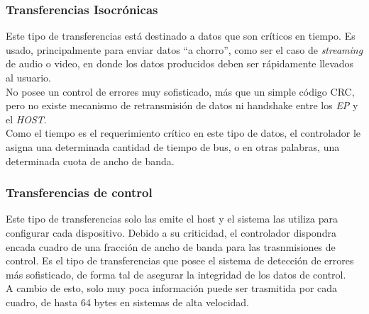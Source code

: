 	\subsubsection*{Transferencias Isocrónicas}
		Este tipo de transferencias está destinado a datos que son críticos en tiempo. Es usado, principalmente para enviar datos ``a chorro'', como ser el caso de {\it streaming} de audio o video, en donde los datos producidos deben ser rápidamente llevados al usuario.\\
	
		No posee un control de errores muy sofisticado, más que un simple código CRC, pero no existe mecanismo de retransmisión de datos ni handshake entre los {\it EP} y el {\it HOST}.\\
	
		Como el tiempo es el requerimiento crítico en este tipo de datos, el controlador le asigna una determinada cantidad de tiempo de bus, o en otras palabras, una determinada cuota de ancho de banda.\\
	
	\subsubsection*{Transferencias de control}
		Este tipo de transferencias solo las emite el host y el sistema las utiliza para configurar cada dispositivo. Debido a su criticidad, el controlador dispondra encada cuadro de una fracción de ancho de banda para las trasnmisiones de control. Es el tipo de transferencias que posee el sistema de detección de errores más sofisticado, de forma tal de asegurar la integridad de los datos de control.\\
	
		A cambio de esto, solo muy poca información puede ser trasmitida por cada cuadro, de hasta 64 bytes en sistemas de alta velocidad.\\

